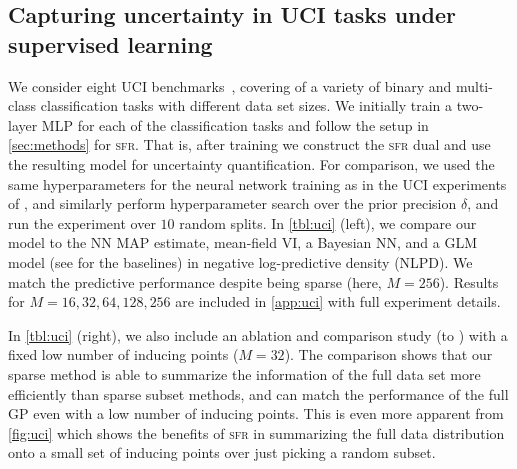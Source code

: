 \documentclass{article}
\newcommand{\our}{\textsc{sfr}\xspace}
\newcommand{\mbf}[1]{\mathbf{#1}}
\newcommand{\MI}{\mbf{I}}
\begin{document}
\subsection{Capturing uncertainty in UCI tasks under supervised learning}
\label{sec:uci}
%
We consider eight UCI benchmarks~\cite{UCI}, covering of a variety of binary and multi-class classification tasks with different data set sizes. We initially train a two-layer MLP for each of the classification tasks and follow the setup in \cref{sec:methods} for \our. That is, after training we construct the \our dual and use the resulting model for uncertainty quantification. For comparison, we used the same hyperparameters for the neural network training as in the UCI experiments of \cite{immer2021improving}, and similarly perform hyperparameter search over the prior precision $\delta$, and run the experiment over $10$ random splits. In \cref{tbl:uci} (left), we compare our model to the NN MAP estimate, mean-field VI, a Bayesian NN, and a GLM model (see \cite{immer2021improving} for the baselines) in negative log-predictive density (NLPD). We match the predictive performance despite being sparse (here, $M=256$). Results for $M=16,32,64,128,256$ are included in \cref{app:uci} with full experiment details. 

In \cref{tbl:uci} (right), we also include an ablation and comparison study (to \cite{immer2021improving}) with a fixed low number of inducing points ($M=32$). The comparison shows that our sparse method is able to summarize the information of the full data set more efficiently than sparse subset methods, and can match the performance of the full GP even with a low number of inducing points. This is even more apparent from \cref{fig:uci} which shows the benefits of \our in summarizing the full data distribution onto a small set of inducing points over just picking a random subset.



\end{document}
